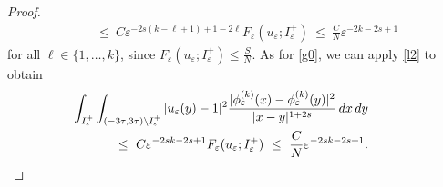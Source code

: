 \documentclass{article}
\newcommand{\e}{\varepsilon}
\begin{document}
\begin{proof}
\begin{eqnarray}
&&\leq\ C\e^{-2s(k-\ell+1)+1-2\ell}F_\e(u_\e;I_\e^+)\ 
\leq\ \frac{C}{N}\e^{-2k-2s+1}%
\end{eqnarray}
for all $\ell\in\{1,\dots, k\}$, since $F_\e(u_\e;I_\e^+)\leq \frac{S}{N}$. 
As for \eqref{g0}, we can apply \eqref{l2}  to obtain 
\begin{eqnarray}\label{g0f}
&&\hspace{-2cm}\int_{I_\e^+}\int_{(-3\tau,3\tau)\setminus I_\e^+} |u_\e(y)-1|^2\frac{|\phi_\e^{(k)}(x)-\phi_\e^{(k)}(y)|^2}{|x-y|^{1+2s}}\, dx\, dy
\nonumber\\
&&\leq\ C
\e^{-2sk-2s+1}F_\e(u_\e;I_\e^+)\ \leq\ \frac{C}{N} 
\e^{-2sk-2s+1}.
\end{eqnarray} 


\end{proof}
\end{document}
